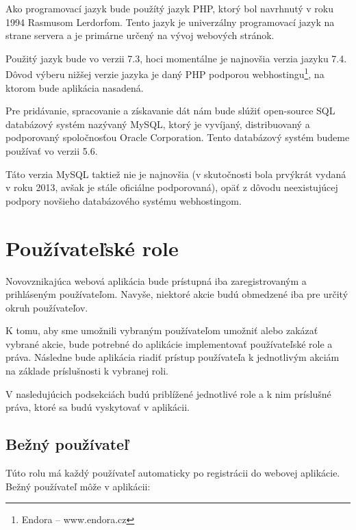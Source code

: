 Ako programovací jazyk bude použítý jazyk PHP, ktorý bol navrhnutý v roku 1994 Rasmusom Lerdorfom. Tento jazyk je univerzálny programovací jazyk na strane servera a je primárne určený na vývoj webových stránok.\cite{co-je-php}

Použitý jazyk bude vo verzii 7.3, hoci momentálne je najnovšia verzia jazyku 7.4\cite{verzie-php}.
Dôvod výberu nižšej verzie jazyka je daný PHP podporou webhostingu\footnote{Endora -- www.endora.cz}, na ktorom bude aplikácia nasadená.

Pre pridávanie, spracovanie a získavanie dát nám bude slúžiť open-source SQL databázový systém nazývaný MySQL, ktorý je vyvíjaný, distribuovaný a podporovaný spoločnosťou Oracle Corporation\cite{co-je-mysql}. Tento databázový systém budeme používať vo verzii 5.6.

Táto verzia MySQL taktiež nie je najnovšia (v skutočnosti bola prvýkrát vydaná v roku 2013, avšak je stále oficiálne podporovaná\cite{verzie-mysql}), opäť z dôvodu neexistujúcej podpory novšieho databázového systému webhostingom.

\section{Používateľské role}
Novovznikajúca webová aplikácia bude prístupná iba zaregistrovaným a prihláseným používateľom. Navyše, niektoré akcie budú obmedzené iba pre určitý okruh používateľov.

K tomu, aby sme umožnili vybraným používateľom umožniť alebo zakázať vybrané akcie, bude potrebné do aplikácie implementovať používateľské role a práva. Následne bude aplikácia riadiť prístup používateľa k jednotlivým akciám na základe príslušnosti k vybranej roli.

V nasledujúcich podsekciách budú priblížené jednotlivé role a k nim príslušné práva, ktoré sa budú vyskytovať v aplikácii.

\subsection{Bežný používateľ}
Túto rolu má každý používateľ automaticky po registrácii do webovej aplikácie. Bežný používateľ môže v aplikácii: 

